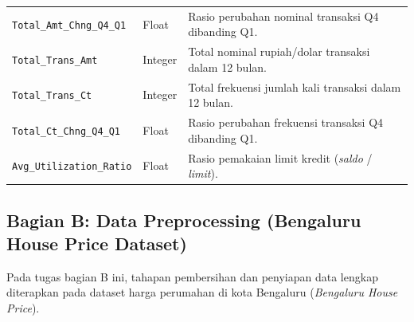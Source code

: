 \documentclass[a4paper,oneside,12pt]{report}
\begin{document}
\begin{enumerate}
\begin{table}[H]
\begin{tabularx}{\textwidth}{l l X}
\texttt{Total\_Amt\_Chng\_Q4\_Q1} & Float & Rasio perubahan nominal transaksi Q4 dibanding Q1. \\
\texttt{Total\_Trans\_Amt} & Integer & Total nominal rupiah/dolar transaksi dalam 12 bulan. \\
\texttt{Total\_Trans\_Ct} & Integer & Total frekuensi jumlah kali transaksi dalam 12 bulan. \\
\texttt{Total\_Ct\_Chng\_Q4\_Q1} & Float & Rasio perubahan frekuensi transaksi Q4 dibanding Q1. \\
\texttt{Avg\_Utilization\_Ratio} & Float & Rasio pemakaian limit kredit (\textit{saldo} / \textit{limit}). \\
\bottomrule
\end{tabularx}
\end{table}
\end{enumerate}

\subsection{Bagian B: Data Preprocessing (Bengaluru House Price Dataset)}
Pada tugas bagian B ini, tahapan pembersihan dan penyiapan data lengkap diterapkan pada dataset harga perumahan di kota Bengaluru (\textit{Bengaluru House Price}).
\end{document}
